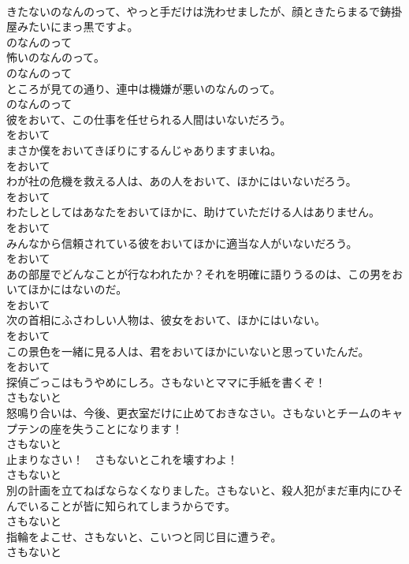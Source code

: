 \documentclass[8pt]{extreport}
\begin{document}
\begin{CJK}{UTF8}{min}
\\	きたないのなんのって、やっと手だけは洗わせましたが、顔ときたらまるで鋳掛屋みたいにまっ黒ですよ。	
\\	のなんのって
\\	怖いのなんのって。	
\\	のなんのって
\\	ところが見ての通り、連中は機嫌が悪いのなんのって。	
\\	のなんのって
\\	彼をおいて、この仕事を任せられる人間はいないだろう。	
\\	をおいて
\\	まさか僕をおいてきぼりにするんじゃありますまいね。	
\\	をおいて
\\	わが社の危機を救える人は、あの人をおいて、ほかにはいないだろう。	
\\	をおいて
\\	わたしとしてはあなたをおいてほかに、助けていただける人はありません。	
\\	をおいて
\\	みんなから信頼されている彼をおいてほかに適当な人がいないだろう。	
\\	をおいて
\\	あの部屋でどんなことが行なわれたか？それを明確に語りうるのは、この男をおいてほかにはないのだ。	
\\	をおいて
\\	次の首相にふさわしい人物は、彼女をおいて、ほかにはいない。	
\\	をおいて
\\	この景色を一緒に見る人は、君をおいてほかにいないと思っていたんだ。	
\\	をおいて
\\	探偵ごっこはもうやめにしろ。さもないとママに手紙を書くぞ！	
\\	さもないと
\\	怒鳴り合いは、今後、更衣室だけに止めておきなさい。さもないとチームのキャプテンの座を失うことになります！	
\\	さもないと
\\	止まりなさい！　さもないとこれを壊すわよ！	
\\	さもないと
\\	別の計画を立てねばならなくなりました。さもないと、殺人犯がまだ車内にひそんでいることが皆に知られてしまうからです。	
\\	さもないと
\\	指輪をよこせ、さもないと、こいつと同じ目に遭うぞ。	
\\	さもないと

\end{CJK}
\end{document}
